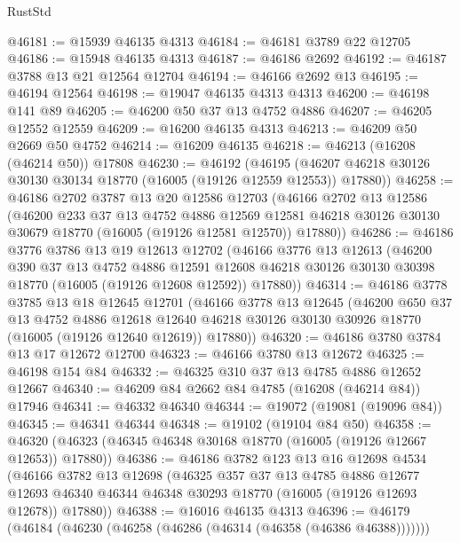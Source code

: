 \begin{lexlean}{RustStd}
\begin{coremodule}
@46181 := @15939 @46135 @4313
@46184 := @46181 @3789 @22 @12705
@46186 := @15948 @46135 @4313
@46187 := @46186 @2692
@46192 := @46187 @3788 @13 @21 @12564 @12704
@46194 := @46166 @2692 @13
@46195 := @46194 @12564
@46198 := @19047 @46135 @4313 @4313
@46200 := @46198 @141 @89
@46205 := @46200 @50 @37 @13 @4752 @4886
@46207 := @46205 @12552 @12559
@46209 := @16200 @46135 @4313
@46213 := @46209 @50 @2669 @50 @4752
@46214 := @16209 @46135
@46218 := @46213 (@16208 (@46214 @50)) @17808
@46230 := @46192
    (@46195 (@46207 @46218 @30126 @30130 @30134 @18770 (@16005 (@19126 @12559 @12553)) @17880))
@46258 := @46186
    @2702
    @3787
    @13
    @20
    @12586
    @12703
    (@46166
      @2702
      @13
      @12586
      (@46200
        @233
        @37
        @13
        @4752
        @4886
        @12569
        @12581
        @46218
        @30126
        @30130
        @30679
        @18770
        (@16005 (@19126 @12581 @12570))
        @17880))
@46286 := @46186
    @3776
    @3786
    @13
    @19
    @12613
    @12702
    (@46166
      @3776
      @13
      @12613
      (@46200
        @390
        @37
        @13
        @4752
        @4886
        @12591
        @12608
        @46218
        @30126
        @30130
        @30398
        @18770
        (@16005 (@19126 @12608 @12592))
        @17880))
@46314 := @46186
    @3778
    @3785
    @13
    @18
    @12645
    @12701
    (@46166
      @3778
      @13
      @12645
      (@46200
        @650
        @37
        @13
        @4752
        @4886
        @12618
        @12640
        @46218
        @30126
        @30130
        @30926
        @18770
        (@16005 (@19126 @12640 @12619))
        @17880))
@46320 := @46186 @3780 @3784 @13 @17 @12672 @12700
@46323 := @46166 @3780 @13 @12672
@46325 := @46198 @154 @84
@46332 := @46325 @310 @37 @13 @4785 @4886 @12652 @12667
@46340 := @46209 @84 @2662 @84 @4785 (@16208 (@46214 @84)) @17946
@46341 := @46332 @46340
@46344 := @19072 (@19081 (@19096 @84))
@46345 := @46341 @46344
@46348 := @19102 (@19104 @84 @50)
@46358 := @46320 (@46323 (@46345 @46348 @30168 @18770 (@16005 (@19126 @12667 @12653)) @17880))
@46386 := @46186
    @3782
    @123
    @13
    @16
    @12698
    @4534
    (@46166
      @3782
      @13
      @12698
      (@46325
        @357
        @37
        @13
        @4785
        @4886
        @12677
        @12693
        @46340
        @46344
        @46348
        @30293
        @18770
        (@16005 (@19126 @12693 @12678))
        @17880))
@46388 := @16016 @46135 @4313
@46396 := @46179 (@46184 (@46230 (@46258 (@46286 (@46314 (@46358 (@46386 @46388)))))))

\end{coremodule}
\end{lexlean}
